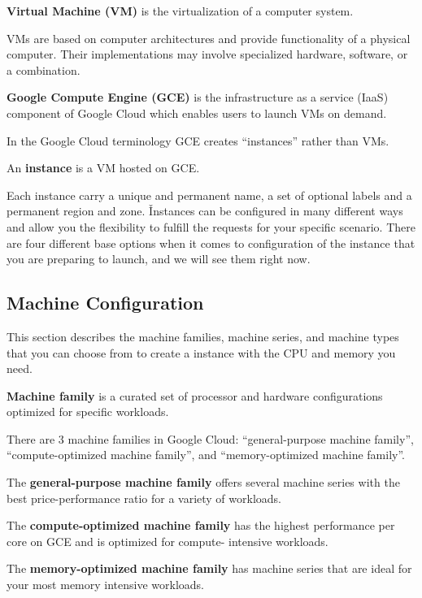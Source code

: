 \textbf{Virtual Machine (VM)} is the virtualization of a computer system.
\ed

VMs are based on computer architectures and provide functionality of a physical computer. Their implementations may
involve specialized hardware, software, or a combination.

\textbf{Google Compute Engine (GCE)} is the infrastructure as a service (IaaS) component of Google Cloud which enables
users to launch VMs on demand.
\ed

In the Google Cloud terminology GCE creates ``instances'' rather than VMs.

\bd[Instance]
An \textbf{instance} is a VM hosted on GCE\@.
\ed

Each instance carry a unique and permanent name, a set of optional labels and a permanent region and zone. \v

Instances can be configured in many different ways and allow you the flexibility to fulfill the requests for your
specific scenario. There are four different base options when it comes to configuration of the instance that you are
preparing to launch, and we will see them right now.

\subsection{Machine Configuration}

This section describes the machine families, machine series, and machine types that you can choose from to create a
instance with the CPU and memory you need.

\textbf{Machine family} is a curated set of processor and hardware configurations optimized for specific workloads.
\ed

There are 3 machine families in Google Cloud: ``general-purpose machine family'', ``compute-optimized machine family'',
and ``memory-optimized machine family''.

The \textbf{general-purpose machine family} offers several machine series with the best price-performance ratio for a
variety of workloads.
\ed

The \textbf{compute-optimized machine family} has the highest performance per core on GCE and is optimized for compute-
intensive workloads.
\ed

The \textbf{memory-optimized machine family} has machine series that are ideal for your most memory intensive workloads.
\ed

